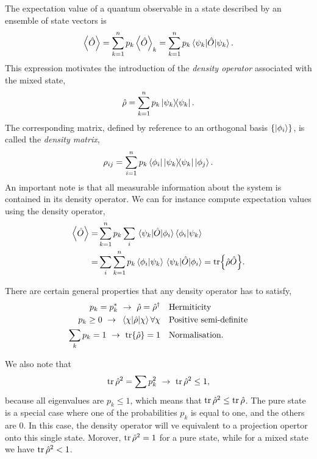     The expectation value of a quantum observable in a state described by an ensemble of state
    vectors is 
    \begin{equation}
        \ev{\hat{O}} = \sum_{k=1}^n p_k \ev{\hat{O}}_k = \sum_{k=1}^n p_k \mel{\psi_k}{\hat{O}}{\psi_k}.
    \end{equation}
    This expression motivates the introduction of the \emph{density operator} associated with 
    the mixed state,
    \begin{equation}
        \hat{\rho} = \sum_{k=1}^n p_k \dyad{\psi_k}.
    \end{equation}
    The corresponding matrix, defined by reference to an orthogonal basis $\{\ket{\phi_i}\}$,
    is called the \emph{density matrix},
    \begin{equation}
        \rho_{ij} = \sum_{i=1}^n p_k \bra{\phi_i}\dyad{\psi_k}\ket{\phi_j}.
    \end{equation}
    An important note is that all measurable information about the system is contained in its 
    density operator. We can for instance compute expectation values using the density operator,
    \begin{equation}
        \begin{aligned}
        \ev{\hat{O}}
            =& \sum_{k=1}^n p_k \sum_i \mel{\psi_k}{\hat{O}}{\phi_i} \braket{\phi_i}{\psi_k} \\
            =& \sum_i \sum_{k=1}^n p_k \braket{\phi_i}{\psi_k} \mel{\psi_k}{\hat{O}}{\phi_i}
            = \tr{\hat{\rho}\hat{O}}.
        \end{aligned}
    \end{equation}
    
    There are certain general properties that any density operator has to satisfy,
    \begin{equation}
        \begin{aligned}
        p_k = p_k^*\ \to\ \hat{\rho}=\hat{\rho}^\dagger &\quad
            \text{Hermiticity} \\
        p_k \geq 0\ \to\ \mel{\chi}{\hat{\rho}}{\chi} \forall \chi &\quad 
            \text{Positive semi-definite} \\
        \sum_k p_k = 1\ \to \ \tr{\hat{\rho}} = 1 &\quad 
            \text{Normalisation}.
        \end{aligned}
    \end{equation}     

    We also note that
    \begin{equation}
        \tr \hat{\rho}^2 = \sum p_k^2 \ \to \ \tr \hat{\rho}^2 \leq 1,
    \end{equation}
    because all eigenvalues are $p_k \leq 1$, which means that $\tr \hat{\rho}^2 \leq \tr \hat{\rho}$.
    The pure state is a special case where one of the probabilities $p_k$ is equal to one, and the others 
    are $0$. In this case, the density operator will ve equivalent to a projection opertor onto this single 
    state. Morover, $\tr\hat{\rho}^2 = 1$ for a pure state, while for a mixed state we have 
    $\tr\hat{\rho}^2 <1$.